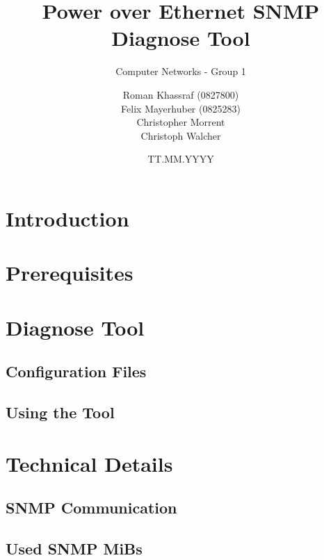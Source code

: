 \documentclass[a4paper, 12pt]{scrartcl}
\title{Power over Ethernet SNMP Diagnose Tool}
\subtitle{Computer Networks - Group 1}
\author{Roman Khassraf (0827800)\\ Felix Mayerhuber (0825283) \\ Christopher Morrent \\ Christoph Walcher }
\date{TT.MM.YYYY}
\begin{document}
\maketitle

\section{Introduction}

\section{Prerequisites}

\section{Diagnose Tool}

\subsection{Configuration Files}

\subsection{Using the Tool}

\section{Technical Details}

\subsection{SNMP Communication}

\subsection{Used SNMP MiBs}
\end{document}
